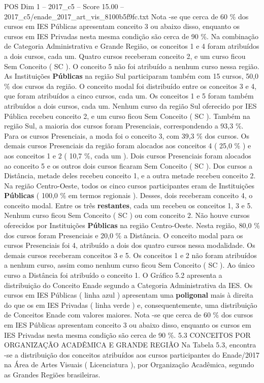 \begin{textsample}{POS Dim 1 – 2017\_c5 – Score 15.00 – 2017\_c5/enade\_2017\_art\_vis\_8100b5f9fc.txt}
Nota -se que cerca de 60 \% dos cursos em IES Públicas apresentam conceito 3 ou abaixo disso, enquanto os cursos em IES Privadas nesta mesma condição são cerca de 90 \%.
Na combinação de Categoria Administrativa e Grande Região, os conceitos 1 e 4 foram atribuídos a dois cursos, cada um.
Quatro cursos receberam conceito 2, e um curso ficou Sem Conceito ( SC ).
O conceito 5 não foi atribuído a nenhum curso nessa região.
As Instituições \textbf{Públicas} na região Sul participaram também com 15 cursos, 50,0 \% dos cursos da região.
O conceito modal foi distribuído entre os conceitos 3 e 4, que foram atribuídos a cinco cursos, cada um.
Os conceitos 1 e 5 foram também atribuídos a dois cursos, cada um.
Nenhum curso da região Sul oferecido por IES Pública recebeu conceito 2, e um curso ficou Sem Conceito ( SC ).
Também na região Sul, a maioria dos cursos foram Presenciais, correspondendo a 93,3 \%.
Para os cursos Presenciais, a moda foi o conceito 3, com 39,3 \% dos cursos.
Os demais cursos Presenciais da região foram alocados aos conceitos 4 ( 25,0 \% ) e aos conceitos 1 e 2 ( 10,7 \%, cada um ).
Dois cursos Presenciais foram alocados ao conceito 5 e os outros dois cursos ficaram Sem Conceito ( SC ).
Dos cursos a Distância, metade deles recebeu conceito 1, e a outra metade recebeu conceito 2.
Na região Centro-Oeste, todos os cinco cursos participantes eram de Instituições \textbf{Públicas} ( 100,0 \% em termos regionais ).
Desses, dois receberam conceito 4, o conceito modal.
Entre os três \textbf{restantes}, cada um recebeu os conceitos 1, 3 e 5.
Nenhum curso ficou Sem Conceito ( SC ) ou com conceito 2.
Não houve cursos oferecidos por Instituições \textbf{Públicas} na região Centro-Oeste.
Nesta região, 80,0 \% dos cursos foram Presenciais e 20,0 \% a Distância.
O conceito modal para os cursos Presenciais foi 4, atribuído a dois dos quatro cursos nessa modalidade.
Os demais cursos receberam conceitos 3 e 5.
Os conceitos 1 e 2 não foram atribuídos a nenhum curso, assim como nenhum curso ficou Sem Conceito ( SC ).
Ao único curso a Distância foi atribuído o conceito 1.
O Gráfico 5.2 apresenta a distribuição do Conceito Enade segundo a Categoria Administrativa da IES.
Os cursos em IES Públicas ( linha azul ) apresentam uma \textbf{poligonal} mais à direita do que os em IES Privadas ( linha verde ) e, consequentemente, uma distribuição de Conceitos Enade com valores maiores.
Nota -se que cerca de 60 \% dos cursos em IES Públicas apresentam conceito 3 ou abaixo disso, enquanto os cursos em IES Privadas nesta mesma condição são cerca de 90 \%. 5.3 CONCEITOS POR ORGANIZAÇÃO ACADÊMICA E GRANDE REGIÃO Na Tabela 5.3, encontra -se a distribuição dos conceitos atribuídos aos cursos participantes do Enade/2017 na Área de Artes Visuais ( Licenciatura ), por Organização Acadêmica, segundo as Grandes Regiões brasileiras.

\end{textsample}

